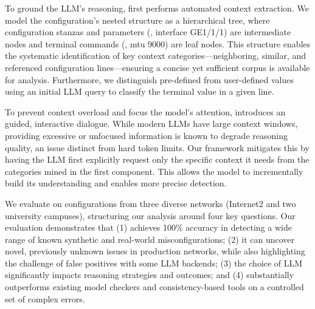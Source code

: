 To ground the LLM's reasoning, \sysname{} first performs automated context extraction. We model the configuration's nested structure as a hierarchical tree, where configuration stanzas and parameters (\eg, interface GE1/1/1) are intermediate nodes and terminal commands (\eg, mtu 9000) are leaf nodes. This structure enables the systematic identification of key context categories—neighboring, similar, and referenced configuration lines—ensuring a concise yet sufficient corpus is available for analysis. Furthermore, we distinguish pre-defined from user-defined values using an initial LLM query to classify the terminal value in a given line.

To prevent context overload and focus the model's attention, \sysname{} introduces an guided, interactive dialogue. While modern LLMs have large context windows, providing excessive or unfocused information is known to degrade reasoning quality, an issue distinct from hard token limits. Our framework mitigates this by having the LLM first explicitly request only the specific context it needs from the categories mined in the first component. This allows the model to incrementally build its understanding and enables more precise detection.


We evaluate \sysname{} on configurations from three diverse networks (Internet2 and two university campuses), structuring our analysis around four key questions. Our evaluation demonstrates that (1) \sysname{} achieves 100\% accuracy in detecting a wide range of known synthetic and real-world misconfigurations; (2) it can uncover novel, previously unknown issues in production networks, while also highlighting the challenge of false positives with some LLM backends; (3) the choice of LLM significantly impacts reasoning strategies and outcomes; and (4) \sysname{} substantially outperforms existing model checkers and consistency-based tools on a controlled set of complex errors.